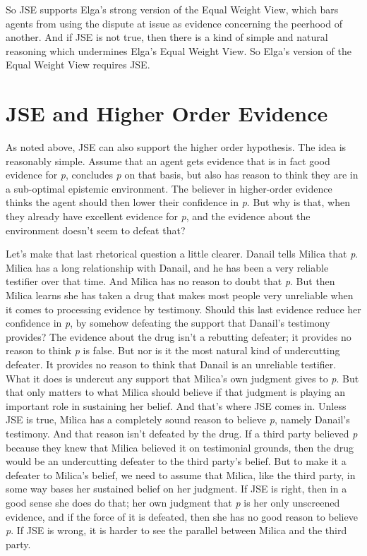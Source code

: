 So JSE supports Elga's strong version of the Equal Weight View, which bars agents from using the dispute at issue as evidence concerning the peerhood of another. And if JSE is not true, then there is a kind of simple and natural reasoning which undermines Elga's Equal Weight View. So Elga's version of the Equal Weight View requires JSE.

\section{JSE and Higher Order Evidence}
\label{jseandhigherorderevidence}

As noted above, JSE can also support the higher order hypothesis. The idea is reasonably simple. Assume that an agent gets evidence that is in fact good evidence for \emph{p}, concludes \emph{p} on that basis, but also has reason to think they are in a sub-optimal epistemic environment. The believer in higher-order evidence thinks the agent should then lower their confidence in \emph{p}. But why is that, when they already have excellent evidence for \emph{p}, and the evidence about the environment doesn't seem to defeat that?

Let's make that last rhetorical question a little clearer. \gls{Danail} tells \gls{Milica} that \emph{p}. \gls{Milica} has a long relationship with \gls{Danail}, and he has been a very reliable testifier over that time. And \gls{Milica} has no reason to doubt that \emph{p}. But then \gls{Milica} learns she has taken a drug that makes most people very unreliable when it comes to processing evidence by testimony. Should this last evidence reduce her confidence in \emph{p}, by somehow defeating the support that \gls{Danail}'s testimony provides? The evidence about the drug isn't a rebutting defeater; it provides no reason to think \emph{p} is false. But nor is it the most natural kind of undercutting defeater. It provides no reason to think that \gls{Danail} is an unreliable testifier. What it does is undercut any support that \gls{Milica}'s own judgment gives to \emph{p}. But that only matters to what \gls{Milica} should believe if that judgment is playing an important role in sustaining her belief. And that's where JSE comes in. Unless JSE is true, \gls{Milica} has a completely sound reason to believe \emph{p}, namely \gls{Danail}'s testimony. And that reason isn't defeated by the drug. If a third party believed \emph{p} because they knew that \gls{Milica} believed it on testimonial grounds, then the drug would be an undercutting defeater to the third party's belief. But to make it a defeater to \gls{Milica}'s belief, we need to assume that \gls{Milica}, like the third party, in some way bases her sustained belief on her judgment. If JSE is right, then in a good sense she does do that; her own judgment that \emph{p} is her only unscreened evidence, and if the force of it is defeated, then she has no good reason to believe \emph{p}. If JSE is wrong, it is harder to see the parallel between \gls{Milica} and the third party.

